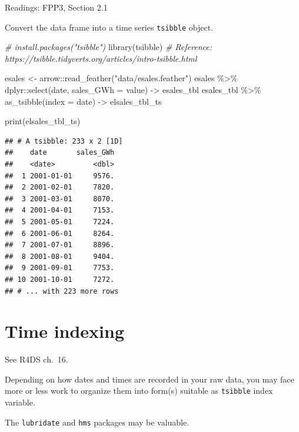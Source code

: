 \documentclass[
]{book}
\newenvironment{Shaded}{\begin{snugshade}}{\end{snugshade}}
\newcommand{\AttributeTok}[1]{\textcolor[rgb]{0.77,0.63,0.00}{#1}}
\newcommand{\CommentTok}[1]{\textcolor[rgb]{0.56,0.35,0.01}{\textit{#1}}}
\newcommand{\FunctionTok}[1]{\textcolor[rgb]{0.00,0.00,0.00}{#1}}
\newcommand{\NormalTok}[1]{#1}
\newcommand{\OtherTok}[1]{\textcolor[rgb]{0.56,0.35,0.01}{#1}}
\newcommand{\SpecialCharTok}[1]{\textcolor[rgb]{0.00,0.00,0.00}{#1}}
\newcommand{\StringTok}[1]{\textcolor[rgb]{0.31,0.60,0.02}{#1}}
\begin{document}
Readings: FPP3, Section 2.1

Convert the data frame into a time series \texttt{tsibble} object.

\begin{Shaded}
\begin{Highlighting}[]
\CommentTok{\# install.packages("tsibble")}
\FunctionTok{library}\NormalTok{(tsibble) }\CommentTok{\# Reference: https://tsibble.tidyverts.org/articles/intro{-}tsibble.html}

\NormalTok{esales }\OtherTok{\textless{}{-}}\NormalTok{ arrow}\SpecialCharTok{::}\FunctionTok{read\_feather}\NormalTok{(}\StringTok{"data/esales.feather"}\NormalTok{)}
\NormalTok{esales }\SpecialCharTok{\%\textgreater{}\%}
\NormalTok{  dplyr}\SpecialCharTok{::}\FunctionTok{select}\NormalTok{(date, }\AttributeTok{sales\_GWh =}\NormalTok{ value) }\OtherTok{{-}\textgreater{}}\NormalTok{ esales\_tbl}
\NormalTok{esales\_tbl }\SpecialCharTok{\%\textgreater{}\%} \FunctionTok{as\_tsibble}\NormalTok{(}\AttributeTok{index =}\NormalTok{ date) }\OtherTok{{-}\textgreater{}}\NormalTok{ elsales\_tbl\_ts}

\FunctionTok{print}\NormalTok{(elsales\_tbl\_ts)}
\end{Highlighting}
\end{Shaded}

\begin{verbatim}
## # A tsibble: 233 x 2 [1D]
##    date       sales_GWh
##    <date>         <dbl>
##  1 2001-01-01     9576.
##  2 2001-02-01     7820.
##  3 2001-03-01     8070.
##  4 2001-04-01     7153.
##  5 2001-05-01     7224.
##  6 2001-06-01     8264.
##  7 2001-07-01     8896.
##  8 2001-08-01     9404.
##  9 2001-09-01     7753.
## 10 2001-10-01     7272.
## # ... with 223 more rows
\end{verbatim}

\hypertarget{time-indexing}{%
\section{Time indexing}\label{time-indexing}}

See R4DS ch.~16.

Depending on how dates and times are recorded in your raw data, you may face more or less work to organize them into form(s) suitable as \texttt{tsibble} index variable.

The \texttt{lubridate} and \texttt{hms} packages may be valuable.
\end{document}
